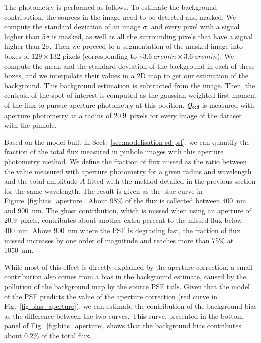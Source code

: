 The photometry is performed as follows. To estimate the background contribution, the sources in the image need to be detected and masked. We compute the standard deviation of an image $\sigma$, and every pixel with a signal higher than 5$\sigma$ is masked, as well as all the surrounding pixels that have a signal higher than 2$\sigma$. Then we proceed to a segmentation of the masked image into boxes of $129\times132$ pixels (corresponding to \textasciitilde $\SI{3.6}{arcmin} \times \SI{3.6}{arcmin}$). We compute the mean and the standard deviation of the background in each of these boxes, and we interpolate their values in a 2D map to get our estimation of the background. This background estimation is subtracted from the image. Then, the centroid of the spot of interest is computed as the gaussian-weighted first moment of the flux to pursue aperture photometry at this position. $Q_{\mathrm{ccd}}$ is measured with aperture photometry at a radius of \SI{20.9}{pixels} for every image of the dataset with the \spinhole pinhole.

Based on the model built in Sect.~\ref{sec:modelisation-sd-psf}, we can quantify the fraction of the total flux measured in \spinhole pinhole images with this aperture photometry method. We define the fraction of flux missed as the ratio between the value measured with aperture photometry for a given radius and wavelength and the total amplitude $A$ fitted with the method detailed in the previous section for the same wavelength. The result is given as the blue curve in Figure~\ref{fig:bias_aperture}. About 98\% of the flux is collected between \SI{400}{\nano\meter} and \SI{900}{\nano\meter}. The ghost contribution, which is missed when using an aperture of \SI{20.9}{pixels}, contributes about another extra percent to the missed flux below \SI{400}{\nano\meter}. Above \SI{900}{\nano\meter} where the PSF is degrading fast, the fraction of flux missed increases by one order of magnitude and reaches more than 75\% at \SI{1050}{nm}.

While most of this effect is directly explained by the aperture correction, a small contribution also comes from a bias in the background estimate, caused by the pollution of the background map by the source PSF tails. Given that the model of the PSF predicts the value of the aperture correction (red curve in Fig.~\ref{fig:bias_aperture}), we can estimate the contribution of the background bias as the difference between the two curves. This curve, presented in the bottom panel of Fig.~\ref{fig:bias_aperture}, shows that the background bias contributes about 0.2\% of the total flux.

